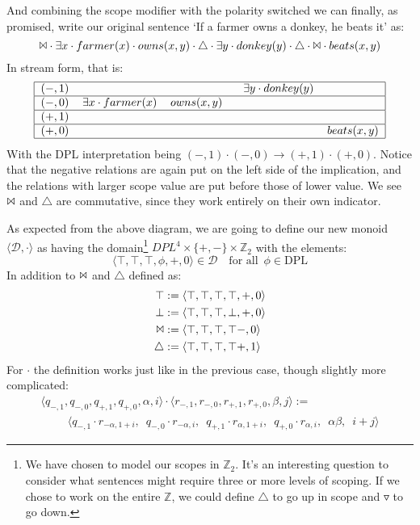 \documentclass[12pt]{article}
\begin{document}
And combining the scope modifier with the polarity switched we can finally, as promised, write our original sentence `If a farmer owns a donkey, he beats it' as:
\begin{equation}
\Bowtie \cdot \exists x \cdot farmer(x) \cdot owns(x,y) \cdot \triangle \cdot \exists y \cdot donkey(y) \cdot \triangle \cdot \Bowtie \cdot beats(x,y)
\end{equation}
%
In stream form, that is:
%
\begin{equation}
\begin{tabular}{|cllll|}
    \hline
    $(-,1)$ & ~ & ~ & ~ $ \exists y \cdot donkey(y)$ & ~ \\\hline
    $(-,0)$ & $\exists x \cdot farmer(x)$ & $owns(x,y)$ & ~ & ~ \\\hline
    $(+,1)$ & ~ & ~ & ~ & ~ \\\hline
    $(+,0)$ & ~ & ~ & ~ & $beats(x,y)$ \\\hline
\end{tabular}
\end{equation}
%
With the DPL interpretation being $(-,1) \cdot (-,0) \rightarrow (+,1) \cdot (+,0)$. Notice that the negative relations are again put on the left side of the implication, and the relations with larger scope value are put before those of lower value. We see $\Bowtie$ and $\triangle$ are commutative, since they work entirely on their own indicator.

As expected from the above diagram, we are going to define our new monoid $\langle\mathcal{D},\cdot\rangle$ as having the domain\footnote{We have chosen to model our scopes in $\mathbb{Z}_2$. It's an interesting question to consider what sentences might require three or more levels of scoping. If we chose to work on the entire $\mathbb{Z}$, we could define $\triangle$ to go up in scope and $\triangledown$ to go down.} $DPL^4\times\{+,-\}\times\mathbb{Z}_2$ with the elements:
\begin{equation}
\langle \top, \top, \top, \phi, +, 0 \rangle \in \mathcal{D} \quad \text{for all}\enspace \phi\in\text{DPL}
\end{equation}
In addition to $\Bowtie$ and $\triangle$ defined as:
\begin{align}
\top &:= \langle \top, \top, \top, \top, +, 0 \rangle \\
\bot &:= \langle \top, \top, \top, \bot, +, 0 \rangle \\
\Bowtie &:= \langle \top, \top, \top, \top -, 0 \rangle \\
\triangle &:= \langle \top, \top, \top, \top +, 1 \rangle
\end{align}
For $\cdot$ the definition works just like in the previous case, though slightly more complicated:
\begin{align}
&\langle q_{-,1}, q_{-,0}, q_{+,1}, q_{+,0}, \alpha, i \rangle \cdot \langle r_{-,1}, r_{-,0}, r_{+,1}, r_{+,0}, \beta, j \rangle := &\\
&\hspace{1cm}\langle q_{-,1} \cdot r_{-\alpha,1+i},\enspace q_{-,0} \cdot r_{-\alpha,i},\enspace q_{+,1} \cdot r_{\alpha,1+i},\enspace q_{+,0} \cdot r_{\alpha,i},\enspace \alpha\beta,\enspace i+j \rangle& \nonumber
\end{align}
\end{document}
